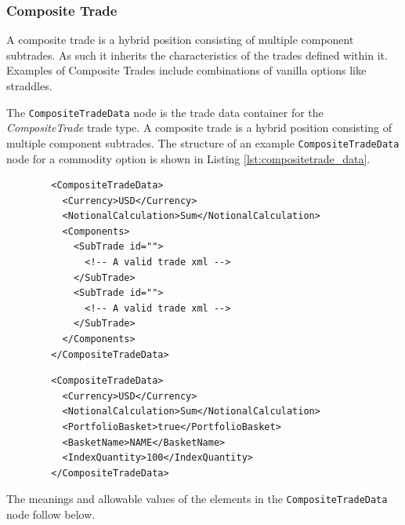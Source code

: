 \subsubsection{Composite Trade}

A composite trade is a hybrid position consisting of multiple component subtrades. As such it inherits the characteristics of the trades defined within it. Examples of Composite Trades include combinations of vanilla options like straddles.

The \lstinline!CompositeTradeData!  node is the trade data container for the  \emph{CompositeTrade} trade type.   A composite trade is a hybrid position consisting of multiple component subtrades. The structure of an example \lstinline!CompositeTradeData! node for a commodity option is shown in 
Listing \ref{lst:compositetrade_data}.

\begin{listing}[H]
	\begin{verbatim}
		<CompositeTradeData>
		  <Currency>USD</Currency>
		  <NotionalCalculation>Sum</NotionalCalculation>
		  <Components>
		    <SubTrade id="">
		      <!-- A valid trade xml -->
		    </SubTrade>
		    <SubTrade id="">
		      <!-- A valid trade xml -->
		    </SubTrade>
		  </Components>
		</CompositeTradeData>
	\end{verbatim}
	\caption{Composite trade data}
	\label{lst:compositetrade_data}
\end{listing}

\begin{listing}[H]
	\begin{verbatim}
		<CompositeTradeData>
		  <Currency>USD</Currency>
		  <NotionalCalculation>Sum</NotionalCalculation>
		  <PortfolioBasket>true</PortfolioBasket>
		  <BasketName>NAME</BasketName>
          <IndexQuantity>100</IndexQuantity>
		</CompositeTradeData>
	\end{verbatim}
	\caption{Composite trade data with Portfolio Reference Data}
\end{listing}

The meanings and allowable values of the elements in the \lstinline!CompositeTradeData!  node follow below.


